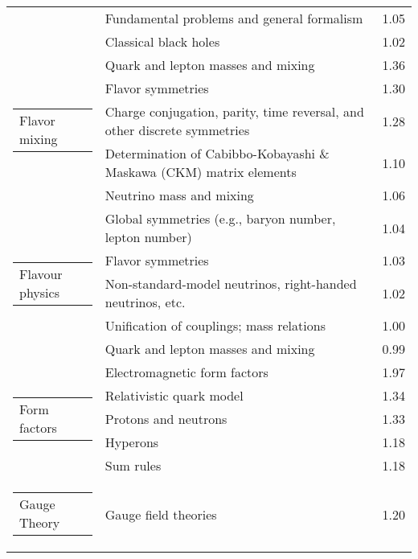 \begin{longtable}[H]{p{}|p{}|p{}}
                                        & Fundamental problems and general formalism &  1.05 \\
                                        & Classical black holes &  1.02 \\
\cline{1-3}
\multirow{5}{*}{\begin{tabular}{l}Flavor mixing\end{tabular}} & Quark and lepton masses and mixing &  1.36 \\
                                        & Flavor symmetries &  1.30 \\
                                        & Charge conjugation, parity, time reversal, and other discrete symmetries &  1.28 \\
                                        & Determination of Cabibbo-Kobayashi \& Maskawa (CKM) matrix elements &  1.10 \\
                                        & Neutrino mass and mixing &  1.06 \\
\cline{1-3}
\multirow{5}{*}{\begin{tabular}{l}Flavour physics\end{tabular}} & Global symmetries (e.g., baryon number, lepton number) &  1.04 \\
                                        & Flavor symmetries &  1.03 \\
                                        & Non-standard-model neutrinos, right-handed neutrinos, etc. &  1.02 \\
                                        & Unification of couplings; mass relations &  1.00 \\
                                        & Quark and lepton masses and mixing &  0.99 \\
\cline{1-3}
\multirow{5}{*}{\begin{tabular}{l}Form factors\end{tabular}} & Electromagnetic form factors &  1.97 \\
                                        & Relativistic quark model &  1.34 \\
                                        & Protons and neutrons &  1.33 \\
                                        & Hyperons &  1.18 \\
                                        & Sum rules &  1.18 \\
\cline{1-3}
\multirow{5}{*}{\begin{tabular}{l}Gauge Theory\end{tabular}} & Gauge field theories &  1.20 \\

\end{longtable}
